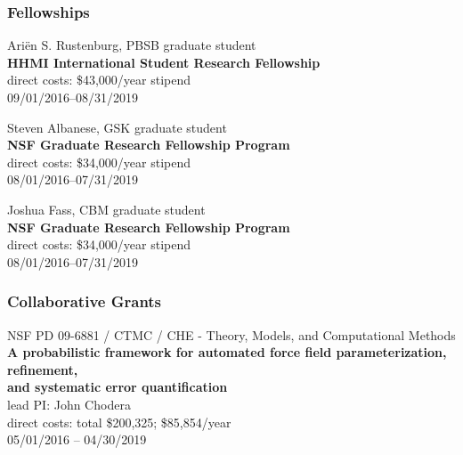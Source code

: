 \documentclass[10pt]{article}
\begin{document}
\subsubsection*{Fellowships}

%

Ari\"{e}n S. Rustenburg, PBSB graduate student\\
{\bf HHMI International Student Research Fellowship}\\
direct costs: \$43,000/year stipend\\
09/01/2016--08/31/2019

\vspace{2ex}

Steven Albanese, GSK graduate student\\
{\bf NSF Graduate Research Fellowship Program}\\
direct costs: \$34,000/year stipend\\
08/01/2016--07/31/2019

\vspace{2ex}

Joshua Fass, CBM graduate student\\
{\bf NSF Graduate Research Fellowship Program}\\
direct costs: \$34,000/year stipend\\
08/01/2016--07/31/2019




\subsubsection*{Collaborative Grants}

NSF PD 09-6881 / CTMC / CHE - Theory, Models, and Computational Methods\\
{\bf A probabilistic framework for automated force field parameterization, refinement,\\
and systematic error quantification}\\
lead PI: John Chodera\\
direct costs: total \$200,325; \$85,854/year\\
05/01/2016 -- 04/30/2019
\end{document}
